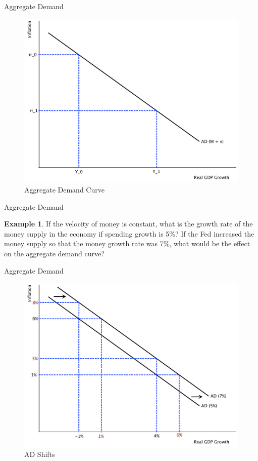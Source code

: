 \documentclass[xcolor={dvipsnames},pdf, hyperref={colorlinks=true, citecolor=ForestGreen, linkcolor=BlueViolet, urlcolor=Magenta}]{beamer}
\theoremstyle{definition}
\newtheorem{exmp}{Example}[section]
\begin{document}
\begin{frame}{Aggregate Demand}

\begin{figure}[H]
	\centering
	\includegraphics[scale=.40]{plot95.pdf}
	\caption{Aggregate Demand Curve}
	
\end{figure}

\end{frame}

\begin{frame}{Aggregate Demand}
\begin{exmp}
	If the velocity of money is constant, what is the growth rate of the money supply in the economy if spending growth is 5\%? If the Fed increased the money supply so that the money growth rate was 7\%, what would be the effect on the aggregate demand curve?
\end{exmp} 
\end{frame}

\begin{frame}{Aggregate Demand}
\begin{figure}[H]
	\centering
	\includegraphics[scale=.40]{plot96.pdf}
	\caption{AD Shifts}
\end{figure}
\end{frame}
\end{document}
